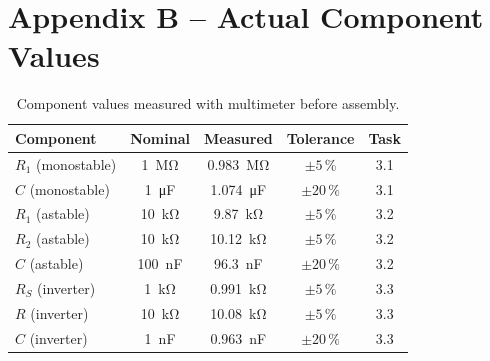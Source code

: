 \documentclass[12pt, a4paper]{article}
\begin{document}
\appendix
\section{Appendix B -- Actual Component Values}

\begin{table}[H]
  \centering
  \caption{Component values measured with multimeter before assembly.}
  \label{tab:components}
  \begin{tabular}{lcccc}
    \toprule
    Component & Nominal & Measured & Tolerance & Task \\
    \midrule
    $R_1$ (monostable)  & \SI{1}{\mega\ohm}     & \SI{0.983}{\mega\ohm}   & $\pm5\,\%$  & 3.1 \\
    $C$  (monostable)   & \SI{1}{\micro\farad}  & \SI{1.074}{\micro\farad}& $\pm20\,\%$ & 3.1 \\
    $R_1$ (astable)     & \SI{10}{\kilo\ohm}    & \SI{9.87}{\kilo\ohm}    & $\pm5\,\%$  & 3.2 \\
    $R_2$ (astable)     & \SI{10}{\kilo\ohm}    & \SI{10.12}{\kilo\ohm}   & $\pm5\,\%$  & 3.2 \\
    $C$  (astable)      & \SI{100}{\nano\farad} & \SI{96.3}{\nano\farad}  & $\pm20\,\%$ & 3.2 \\
    $R_S$ (inverter)    & \SI{1}{\kilo\ohm}     & \SI{0.991}{\kilo\ohm}   & $\pm5\,\%$  & 3.3 \\
    $R$  (inverter)     & \SI{10}{\kilo\ohm}    & \SI{10.08}{\kilo\ohm}   & $\pm5\,\%$  & 3.3 \\
    $C$  (inverter)     & \SI{1}{\nano\farad}   & \SI{0.963}{\nano\farad} & $\pm20\,\%$ & 3.3 \\
    \bottomrule
  \end{tabular}
\end{table}
\end{document}
